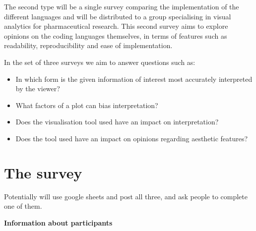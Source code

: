 The second type will be a single survey comparing the 
implementation of the different languages and will be distributed to a group specialising in visual analytics for pharmaceutical 
research. This second survey aims to explore opinions on the coding languages themselves, in terms of features such as 
readability, reproducibility and ease of implementation.



In the set of three surveys we aim to answer questions such as: 

\begin{itemize}
    \item In which form is the given information of interest most accurately interpreted by the viewer?
    \item What factors of a plot can bias interpretation? 
    \item Does the visualisation tool used have an impact on interpretation?
    \item Does the tool used have an impact on opinions regarding aesthetic features?
\end{itemize}



\section{The survey}

Potentially will use google sheets and post all three, and ask people to complete one of them.


\textbf{Information about participants}



